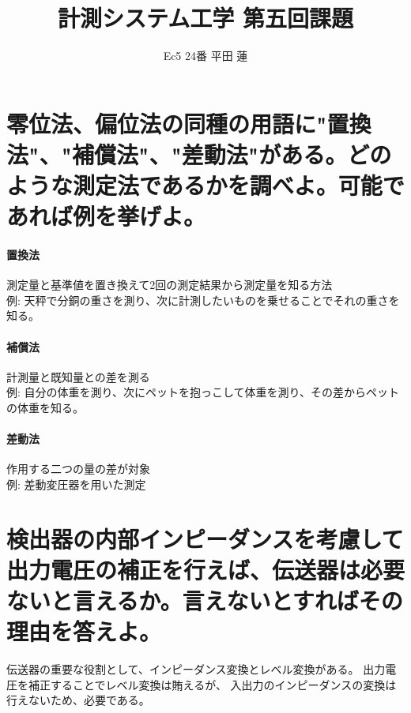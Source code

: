 \documentclass{jsarticle}
\title{計測システム工学 第五回課題}
\author{Ec5 24番 平田 蓮}
\date{}
\begin{document}
\maketitle
\section{零位法、偏位法の同種の用語に"置換法"、"補償法"、"差動法"がある。どのような測定法であるかを調べよ。可能であれば例を挙げよ。}
    \paragraph{置換法} 測定量と基準値を置き換えて2回の測定結果から測定量を知る方法 \\
        例: 天秤で分銅の重さを測り、次に計測したいものを乗せることでそれの重さを知る。
    \paragraph{補償法} 計測量と既知量との差を測る \\
        例: 自分の体重を測り、次にペットを抱っこして体重を測り、その差からペットの体重を知る。
    \paragraph{差動法} 作用する二つの量の差が対象 \\
        例: 差動変圧器を用いた測定
\section{検出器の内部インピーダンスを考慮して出力電圧の補正を行えば、伝送器は必要ないと言えるか。言えないとすればその理由を答えよ。}
    伝送器の重要な役割として、インピーダンス変換とレベル変換がある。
    出力電圧を補正することでレベル変換は賄えるが、
    入出力のインピーダンスの変換は行えないため、必要である。
\end{document}
